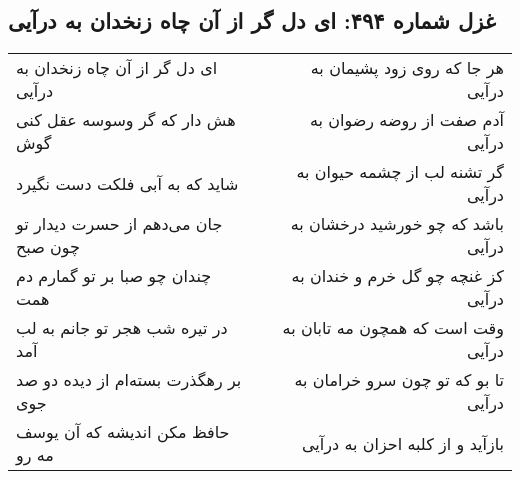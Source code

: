 \begin{center}
\section*{غزل شماره ۴۹۴: ای دل گر از آن چاه زنخدان به درآیی}
\label{sec:sh494}
\begin{longtable}{l p{0.5cm} r}
ای دل گر از آن چاه زنخدان به درآیی
&&
هر جا که روی زود پشیمان به درآیی
\\
هش دار که گر وسوسه عقل کنی گوش
&&
آدم صفت از روضه رضوان به درآیی
\\
شاید که به آبی فلکت دست نگیرد
&&
گر تشنه لب از چشمه حیوان به درآیی
\\
جان می‌دهم از حسرت دیدار تو چون صبح
&&
باشد که چو خورشید درخشان به درآیی
\\
چندان چو صبا بر تو گمارم دم همت
&&
کز غنچه چو گل خرم و خندان به درآیی
\\
در تیره شب هجر تو جانم به لب آمد
&&
وقت است که همچون مه تابان به درآیی
\\
بر رهگذرت بسته‌ام از دیده دو صد جوی
&&
تا بو که تو چون سرو خرامان به درآیی
\\
حافظ مکن اندیشه که آن یوسف مه رو
&&
بازآید و از کلبه احزان به درآیی
\\
\end{longtable}
\end{center}
